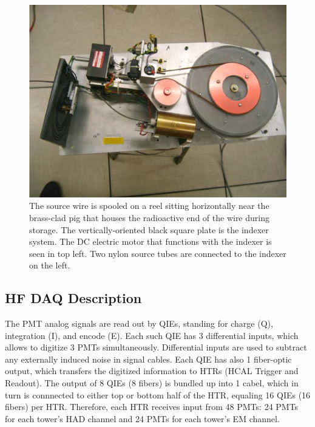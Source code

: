 \begin{figure}[htb]
   \begin{center}
      \includegraphics[width=.5\textwidth]{figures/ch_hfcalibration/Source_Driver.png}
      \caption{The source wire is spooled on a reel sitting horizontally near
      the brass-clad pig that houses the radioactive end of the wire during storage.
      The vertically-oriented black square plate is the indexer system. The DC electric
      motor that functions with the indexer is seen in top left. Two nylon source tubes
      are connected to the indexer on the left.}
      \label{fig:Source_Driver}
   \end{center}
\end{figure}

\subsection{HF DAQ Description}
The PMT analog signals are read out by QIEs, standing for charge (Q),
integration (I), and encode (E). Each such QIE has 3 differential inputs, which
allows to digitize 3 PMTs simultaneously. Differential inputs are used to subtract
any externally induced noise in signal cables. Each QIE has also 1 fiber-optic
output, which transfers the digitized information to HTRs (HCAL Trigger and
Readout). The output of 8 QIEs (8 fibers) is bundled up into 1 cabel, which in
turn is connnected to either top or bottom half of the HTR, equaling 16 QIEs
(16 fibers) per HTR. Therefore, each HTR receives input from 48 PMTs: 24 PMTs for
each tower's HAD channel and 24 PMTs for each tower's EM channel.

